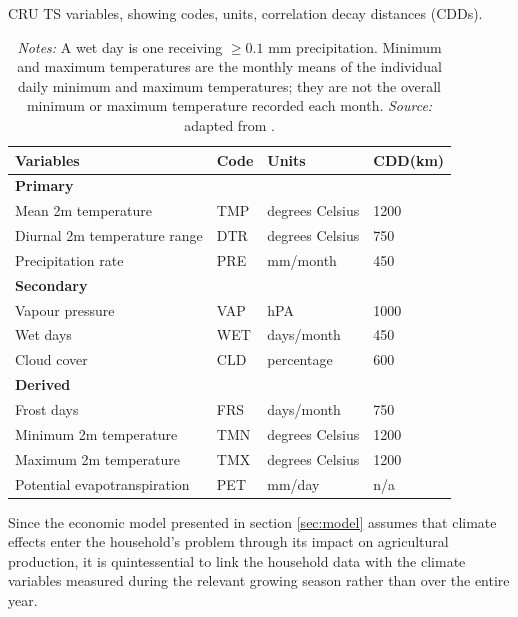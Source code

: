 \documentclass[a4paper,12pt]{article}
\theoremstyle{plain}
\theoremstyle{definition}
\theoremstyle{definition}
\theoremstyle{definition}
\theoremstyle{definition}
\begin{document}
\begin{table}[t!]
    \singlespacing
    \centering
    \caption{CRU TS variables, showing codes, units, correlation decay distances (CDDs).}
    \caption*{\footnotesize{\textit{Notes:} A wet day is one receiving $\geq 0.1$ mm precipitation. Minimum and maximum temperatures are the monthly means of the individual daily minimum and maximum temperatures; they are not the overall minimum or maximum temperature recorded each month. \textit{Source:} adapted from \citet{harris2020}.}}
    \begin{tabular}{|p{6cm}|p{1cm}|p{3cm}|p{2cm}| }
    \hline
    \raggedright\textbf{Variables} & \textbf{Code} & \textbf{Units} & \textbf{CDD(km)} \\
    \hline    
    \textbf{Primary} & \ \ & \ \ & \ \ \\
    \quad Mean 2m temperature & TMP & degrees Celsius & 1200\\
    \quad Diurnal 2m temperature range & DTR & degrees Celsius & 750 \\
    \quad Precipitation rate & PRE & mm/month & 450 \\
    \textbf{Secondary} & \ \ & \ \ & \ \ \\
    \quad Vapour pressure & VAP & hPA & 1000 \\
    \quad Wet days & WET & days/month & 450 \\
    \quad Cloud cover & CLD & percentage & 600 \\
    \textbf{Derived} & \ \ & \ \ & \ \ \\
    \quad Frost days &FRS& days/month & 750 \\
    \quad Minimum 2m temperature &TMN& degrees Celsius & 1200 \\
    \quad Maximum 2m temperature &TMX& degrees Celsius & 1200 \\
    \quad Potential evapotranspiration &PET& mm/day & n/a \\
    \hline
    \end{tabular}
    \label{tab:cruvars}
\end{table}

Since the economic model presented in section \ref{sec:model} assumes that climate effects enter the household's problem through its impact on agricultural production, it is quintessential to link the household data with the climate variables measured during the relevant growing season rather than over the entire year.
\end{document}
